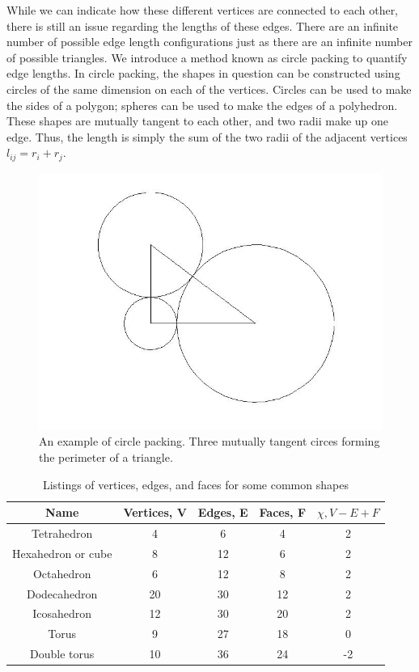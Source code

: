 \documentclass[12pt]{article}
\begin{document}
\noindent While we can indicate how these different vertices are connected to each other, there is still an issue regarding the lengths of these edges. There are an infinite number of possible edge length configurations just as there are an infinite number of possible triangles. We introduce a method known as circle packing to quantify edge lengths. In circle packing, the shapes in question can be constructed using circles of the same dimension on each of the vertices. Circles can be used to make the sides of a polygon; spheres can be used to make the edges of a polyhedron. These shapes are mutually tangent to each other, and two radii make up one edge. Thus, the length is simply the sum of the two radii of the adjacent vertices $l_{ij} = r_i + r_j$.
  
\begin{figure}
\begin{center}
\includegraphics[scale = 0.3]{righttriangulation.jpg}
\end{center}
\caption{An example of circle packing. Three mutually tangent circes forming the perimeter of a triangle.}
\end{figure}

\begin{table}
\begin{tabular}{ccccc}
\label{EuChar}
Name  &	Vertices, V &	Edges, E & Faces, F &	$\chi, V - E + F$\\
\hline 
Tetrahedron &	4 &	6 &	4 &	2\\
Hexahedron or cube &	8 &	12 &	6 &	2\\
Octahedron 	&	6 &	12 &	8 & 2\\
Dodecahedron 	&	20 &	30 &	12 &	2\\
Icosahedron &	12 & 30 & 20 &	2\\
Torus & 9 & 27 & 18 & 0\\
Double torus & 10 & 36 & 24 & -2
\end{tabular}
\caption{Listings of vertices, edges, and faces for some common shapes \cite{wiki}}
\end{table}
\end{document}
